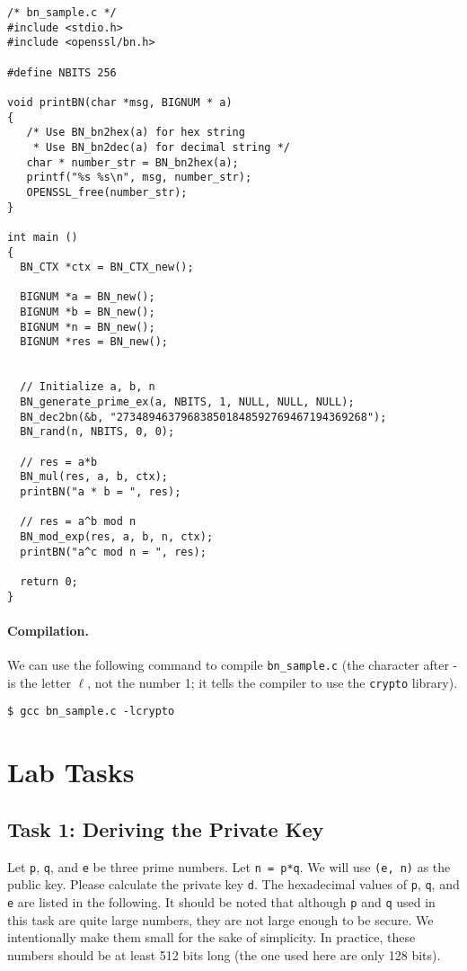 \begin{lstlisting}
/* bn_sample.c */
#include <stdio.h>
#include <openssl/bn.h>

#define NBITS 256

void printBN(char *msg, BIGNUM * a)
{
   /* Use BN_bn2hex(a) for hex string
    * Use BN_bn2dec(a) for decimal string */
   char * number_str = BN_bn2hex(a);
   printf("%s %s\n", msg, number_str);
   OPENSSL_free(number_str);
}

int main ()
{
  BN_CTX *ctx = BN_CTX_new();

  BIGNUM *a = BN_new();
  BIGNUM *b = BN_new();
  BIGNUM *n = BN_new();
  BIGNUM *res = BN_new();


  // Initialize a, b, n
  BN_generate_prime_ex(a, NBITS, 1, NULL, NULL, NULL);
  BN_dec2bn(&b, "273489463796838501848592769467194369268");
  BN_rand(n, NBITS, 0, 0);

  // res = a*b
  BN_mul(res, a, b, ctx);
  printBN("a * b = ", res);

  // res = a^b mod n
  BN_mod_exp(res, a, b, n, ctx);
  printBN("a^c mod n = ", res);

  return 0;
}
\end{lstlisting}



\paragraph{Compilation.} We can use the following command to
compile \texttt{bn\_sample.c} (the
character after - is the letter $\ell$, not the number 1; it tells the compiler to use the
\texttt{crypto} library).

\begin{lstlisting}
$ gcc bn_sample.c -lcrypto
\end{lstlisting}



\section{Lab Tasks}

\subsection{Task 1: Deriving the Private Key}

Let \texttt{p}, \texttt{q}, and \texttt{e} be three prime numbers. Let \texttt{n = p*q}.
We will use \texttt{(e, n)} as the public key. Please calculate the private key \texttt{d}.
The hexadecimal values of \texttt{p}, \texttt{q}, and \texttt{e} are listed in the following. It should be
noted that although \texttt{p} and \texttt{q} used in this task are quite large numbers, they are not large
enough to be secure. We intentionally make them small for the sake of simplicity. In practice,
these numbers should be at least 512 bits long (the one used here are only 128 bits).

